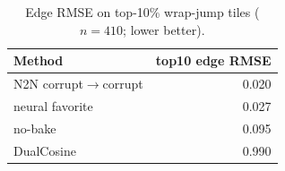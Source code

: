 \begin{table}[t]
  \centering
  \caption{Edge RMSE on top-10\% wrap-jump tiles ($n{=}410$; lower better).}
  \label{tab:cliff-edge-rmse}
  \setlength{\tabcolsep}{6pt}
  \begin{tabular}{@{}lr@{}}
    \toprule
    Method & top10 edge RMSE \\
    \midrule
    N2N corrupt$\to$corrupt & 0.020 \\
    neural favorite & 0.027 \\
    no-bake & 0.095 \\
    DualCosine & 0.990 \\
    \bottomrule
  \end{tabular}
\end{table}

